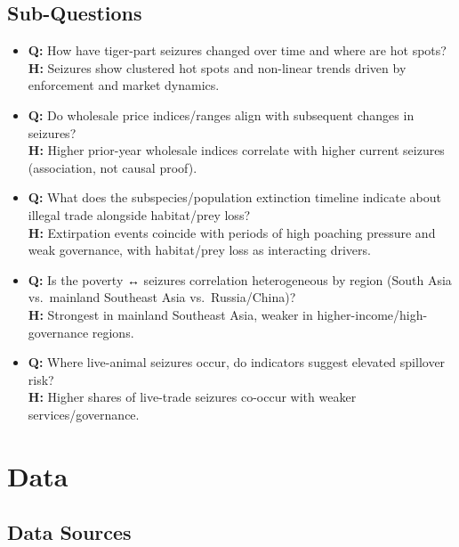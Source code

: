 \documentclass[
]{article}
\begin{document}
\subsection{Sub-Questions}\label{sub-questions}

\begin{itemize}
\item
  \textbf{Q:} How have tiger-part seizures changed over time and where
  are hot spots?\\
  \textbf{H:} Seizures show clustered hot spots and non-linear trends
  driven by enforcement and market dynamics.
\item
  \textbf{Q:} Do wholesale price indices/ranges align with subsequent
  changes in seizures?\\
  \textbf{H:} Higher prior-year wholesale indices correlate with higher
  current seizures (association, not causal proof).
\item
  \textbf{Q:} What does the subspecies/population extinction timeline
  indicate about illegal trade alongside habitat/prey loss?\\
  \textbf{H:} Extirpation events coincide with periods of high poaching
  pressure and weak governance, with habitat/prey loss as interacting
  drivers.
\item
  \textbf{Q:} Is the poverty ↔ seizures correlation heterogeneous by
  region (South Asia vs.~mainland Southeast Asia vs.~Russia/China)?\\
  \textbf{H:} Strongest in mainland Southeast Asia, weaker in
  higher-income/high-governance regions.
\item
  \textbf{Q:} Where live-animal seizures occur, do indicators suggest
  elevated spillover risk?\\
  \textbf{H:} Higher shares of live-trade seizures co-occur with weaker
  services/governance.
\end{itemize}

\section{Data}\label{data}

\subsection{Data Sources}\label{data-sources}
\end{document}
